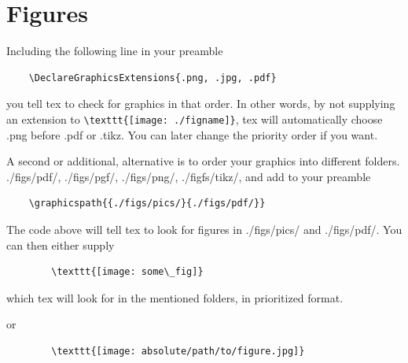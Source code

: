 \section{Figures}
    Including the following line in your preamble

    \begin{lstlisting}
    \DeclareGraphicsExtensions{.png, .jpg, .pdf}
    \end{lstlisting}

    you tell tex to check for graphics in that order. In other words, 
    by not supplying an extension to  \lstinline|\texttt{[image: ./figname]}|, tex will automatically choose .png before .pdf or .tikz.
    You can later change the priority order if you want. 

    A second or additional, alternative is to order your graphics into different folders.
    ./figs/pdf/, ./figs/pgf/, ./figs/png/,  ./figfs/tikz/, and add to your preamble
    
    \begin{lstlisting}
    \graphicspath{{./figs/pics/}{./figs/pdf/}}
    \end{lstlisting}

    The code above will tell tex to look for figures in ./figs/pics/ and ./figs/pdf/.
    You can then either supply

    \begin{lstlisting}
        \texttt{[image: some\_fig]}
    \end{lstlisting}

    which tex will look for in the mentioned folders, in prioritized format. 

    or

    \begin{lstlisting}
        \texttt{[image: absolute/path/to/figure.jpg]}
    \end{lstlisting}

            




